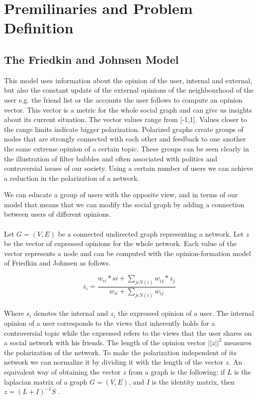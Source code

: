 \chapter{Premilinaries and Problem Definition}
\label{ch:premAndDef}


\section{The Friedkin and Johnsen Model}
\label{sec:prem}

This model uses information about the opinion of the user, internal and external, but also the constant update of the external opinions of the neighbourhood of the user e.g. the friend list or the accounts the user follows
to compute an opinion vector. This vector is a metric for the whole social graph and can give us insights about its current situation. The vector values range from [-1,1]. Values closer to the range limits indicate bigger polarization. Polarized graphs create groups of nodes that are strongly connected with each other and feedback to one another the same extreme opinion of a certain topic. These groups can be seen clearly in the illustration of filter bubbles and often associated with politics and controversial issues of our society. Using a certain number of users we can achieve a reduction in the polarization of a network. 
\clearpage

We can educate a group of users with the opposite view, and in terms of our model that means that we can modify the social graph by adding a connection between  users of different opinions. \\
\\
Let $G = (V,E)$ be a connected undirected graph representing a network. Let $z$ be the vector of expressed opinions  for the whole network. Each value  of the vector represents a node and can be computed with the opinion-formation model of Friedkin and Johnsen as follows. 

\begin{equation} 
	z_i = \frac{w_{ii}*si + \sum_{j \epsilon N(i) }{w_{ij}*z_j}} {w_{ii} + \sum_{j \epsilon N(i) }{w_{ij}}} 
\end{equation} 
\\

Where $s_i$ denotes the internal and $z_i$ the expressed opinion of a user. The internal opinion of a user corresponds to the views that inherently holds for a controversial topic while the expressed refers to the views that the user shares on a social network with his friends. The length of the opinion vector $||z|| ^2$ measures  the polarization of the network. To make the polarization  independent of its network we can  normalize it  by dividing  it with the length of the vector $z$. 
An equivalent way of obtaining the vector $z$ from a graph is the following: if $L$ is the laplacian matrix of a graph $G=(V,E)$, and $I$ is the identity matrix, then $z=(L+I)^{-1}S$ \cite{bindel}. 

